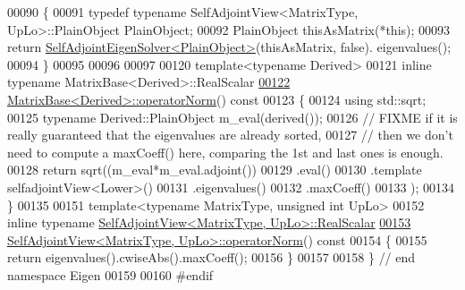 \begin{DoxyCode}
00090 \textcolor{keyword}{}\{
00091   \textcolor{keyword}{typedef} \textcolor{keyword}{typename} SelfAdjointView<MatrixType, UpLo>::PlainObject PlainObject;
00092   PlainObject thisAsMatrix(*\textcolor{keyword}{this});
00093   \textcolor{keywordflow}{return} \hyperlink{group___eigenvalues___module_class_eigen_1_1_self_adjoint_eigen_solver}{SelfAdjointEigenSolver<PlainObject>}(thisAsMatrix, \textcolor{keyword}{false}).
      eigenvalues();
00094 \}
00095 
00096 
00097 
00120 \textcolor{keyword}{template}<\textcolor{keyword}{typename} Derived>
00121 \textcolor{keyword}{inline} \textcolor{keyword}{typename} MatrixBase<Derived>::RealScalar
\hyperlink{group___core___module_a0ff9bc0b9bea2d0822a2bf3192783102}{00122} \hyperlink{group___core___module_a0ff9bc0b9bea2d0822a2bf3192783102}{MatrixBase<Derived>::operatorNorm}()\textcolor{keyword}{ const}
00123 \textcolor{keyword}{}\{
00124   \textcolor{keyword}{using} std::sqrt;
00125   \textcolor{keyword}{typename} Derived::PlainObject m\_eval(derived());
00126   \textcolor{comment}{// FIXME if it is really guaranteed that the eigenvalues are already sorted,}
00127   \textcolor{comment}{// then we don't need to compute a maxCoeff() here, comparing the 1st and last ones is enough.}
00128   \textcolor{keywordflow}{return} sqrt((m\_eval*m\_eval.adjoint())
00129                  .eval()
00130          .template selfadjointView<Lower>()
00131          .eigenvalues()
00132          .maxCoeff()
00133          );
00134 \}
00135 
00151 \textcolor{keyword}{template}<\textcolor{keyword}{typename} MatrixType, \textcolor{keywordtype}{unsigned} \textcolor{keywordtype}{int} UpLo>
00152 \textcolor{keyword}{inline} \textcolor{keyword}{typename} \hyperlink{group___core___module_af9f0234ebeae4c4ca512bcd5fb5e8bb1}{SelfAdjointView<MatrixType, UpLo>::RealScalar}
\hyperlink{group___core___module_a12a7da482e31ec9c517dca92dd7bae61}{00153} \hyperlink{group___core___module_a12a7da482e31ec9c517dca92dd7bae61}{SelfAdjointView<MatrixType, UpLo>::operatorNorm}()\textcolor{keyword}{ const}
00154 \textcolor{keyword}{}\{
00155   \textcolor{keywordflow}{return} eigenvalues().cwiseAbs().maxCoeff();
00156 \}
00157 
00158 \} \textcolor{comment}{// end namespace Eigen}
00159 
00160 \textcolor{preprocessor}{#endif}
\end{DoxyCode}
